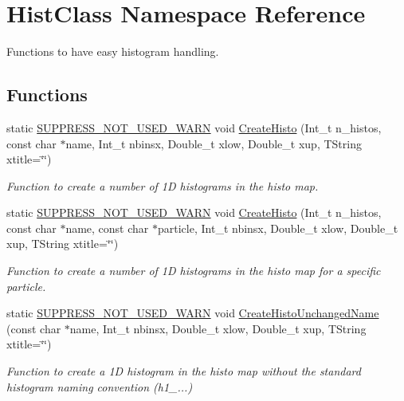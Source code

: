 \section{Hist\-Class Namespace Reference}
\label{namespaceHistClass}


Functions to have easy histogram handling.  


\subsection*{Functions}
\begin{DoxyCompactItemize}
\item 
static \hyperlink{HistClass_8hh_a85edd6ac47f5ea2970c76af20855738c}{S\-U\-P\-P\-R\-E\-S\-S\-\_\-\-N\-O\-T\-\_\-\-U\-S\-E\-D\-\_\-\-W\-A\-R\-N} void \hyperlink{namespaceHistClass_afe4c53f5990fecb7acf800a1677632fd}{Create\-Histo} (Int\-\_\-t n\-\_\-histos, const char $\ast$name, Int\-\_\-t nbinsx, Double\-\_\-t xlow, Double\-\_\-t xup, T\-String xtitle=\char`\"{}\char`\"{})
\begin{DoxyCompactList}\small\item\em Function to create a number of 1\-D histograms in the histo map. \end{DoxyCompactList}\item 
static \hyperlink{HistClass_8hh_a85edd6ac47f5ea2970c76af20855738c}{S\-U\-P\-P\-R\-E\-S\-S\-\_\-\-N\-O\-T\-\_\-\-U\-S\-E\-D\-\_\-\-W\-A\-R\-N} void \hyperlink{namespaceHistClass_ad978c86aade850ac341be3e75c4cfcf6}{Create\-Histo} (Int\-\_\-t n\-\_\-histos, const char $\ast$name, const char $\ast$particle, Int\-\_\-t nbinsx, Double\-\_\-t xlow, Double\-\_\-t xup, T\-String xtitle=\char`\"{}\char`\"{})
\begin{DoxyCompactList}\small\item\em Function to create a number of 1\-D histograms in the histo map for a specific particle. \end{DoxyCompactList}\item 
static \hyperlink{HistClass_8hh_a85edd6ac47f5ea2970c76af20855738c}{S\-U\-P\-P\-R\-E\-S\-S\-\_\-\-N\-O\-T\-\_\-\-U\-S\-E\-D\-\_\-\-W\-A\-R\-N} void \hyperlink{namespaceHistClass_a42ccd4d03cdfb5e52c4976b966b662a9}{Create\-Histo\-Unchanged\-Name} (const char $\ast$name, Int\-\_\-t nbinsx, Double\-\_\-t xlow, Double\-\_\-t xup, T\-String xtitle=\char`\"{}\char`\"{})
\begin{DoxyCompactList}\small\item\em Function to create a 1\-D histogram in the histo map without the standard histogram naming convention (h1\-\_\-...) \end{DoxyCompactList}\item 

\end{DoxyCompactItemize}
